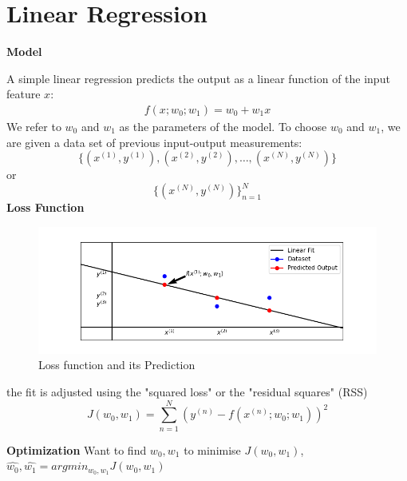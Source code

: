 \documentclass[a4paper, 11pt]{article}
\begin{document}
\section{Linear Regression}
{\Large\textbf{Model}}

A simple linear regression predicts the output as a linear function of the input feature $x$:
\begin{align*}
    f(x;w_0;w_1) = w_0 + w_1x
\end{align*}
We refer to $w_0$ and $w_1$ as the parameters of the model. To choose $w_0$ and $w_1$, we are given a data set of previous input-output measurements:
\[\{(x^{(1)},y^{(1)}),(x^{(2)},y^{(2)}),\dots,(x^{(N)},y^{(N)})\}\]
or
\[\{(x^{(N)},y^{(N)})\}_{n=1}^{N}\]
{\large\textbf{Loss Function}}
\begin{figure}[H]
    \centering
    \includegraphics[scale=0.8]{lossfunction.png}
    \caption{Loss function and its Prediction}
\end{figure}
the fit is adjusted using the "squared loss" or the "residual squares" (RSS)
\begin{equation*}
    J(w_0, w_1) = \sum\limits_{n = 1}^{N}\left(y^{(n)} - f(x^{(n)};w_0;w_1)\right)^{2}
\end{equation*}

{\large\textbf{Optimization}}
Want to find $w_0,  w_1$ to minimise $J(w_0, w_1)$, $\hat{w_0}, \hat{w_1} = argmin_{w_0, w_1}J(w_0, w_1)$
\end{document}
